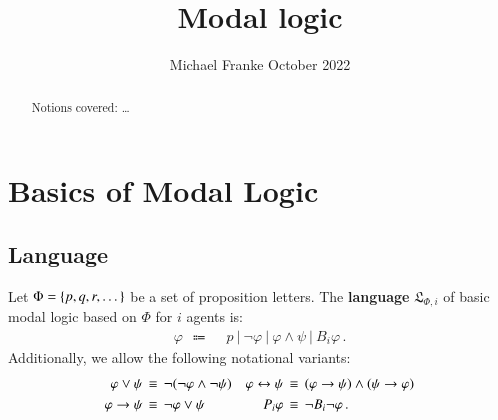 \documentclass[nobib,nofonts]{tufte-handout}
\title{Modal logic }
\author[M.~Franke]{Michael Franke \hfill \normalsize{October 2022}}
\date{} %
\newcommand{\Props}{\ensuremath{\Phi}}
\newcommand{\Lang}{\ensuremath{\mathfrak{L}}}
\newcommand{\ts}{\ensuremath{\thinspace}}
\newcommand{\mybar}{\ensuremath{\ | \ }}
\renewcommand{\phi}{\ensuremath{\varphi}}
\newcommand{\ra}{\ensuremath{\rightarrow}}
\newcommand{\Bel}{\ensuremath{B}}
\newcommand{\Poss}{\ensuremath{P}}
\begin{document}
\maketitle

\begin{abstract}
\noindent
Notions covered: \dots
\end{abstract}

{\color{red}{to be cleaned up and completed}}

\noindent \section{Basics of Modal Logic}
\label{sec:basic-modal-logic}

\subsection{Language}
\label{sec:language}


\begin{definition}[Syntax]
  \label{def:Syntax_modal_logic}
  Let $\Props = \set{p, q, r, \dots}$ be a set of proposition
  letters. The \textbf{language} $\Lang_{\Props,i}$ of basic modal logic based
  on $\Props$ for $i$ agents is:
  \begin{align*}
    \varphi \ \  \Coloneqq \ \ & %
    p \mybar \neg
    \varphi \mybar \varphi \wedge \psi %
    \mybar  \Bel_i  \phi\,.
  \end{align*}
  Additionally, we allow the following notational variants:
  \begin{align*}
    \varphi \vee \psi & \ts \equiv \ts \neg (\neg\varphi \wedge
    \neg\psi) &    \phi \leftrightarrow \psi & \ts \equiv \ts (\phi \ra \psi) \wedge (\psi \ra \phi) \\
    \varphi \ra \psi & \ts \equiv \ts \neg \varphi \vee \psi &
    \Poss_i \phi & \ts \equiv \ts \neg \Bel_i \neg \phi\,.
  \end{align*}


\end{definition}
\end{document}
